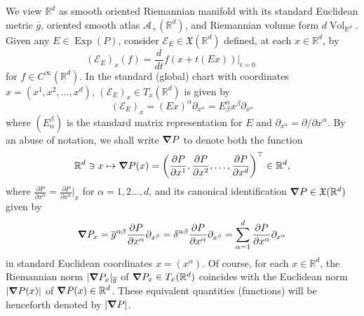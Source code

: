 \documentclass[11pt]{article}
\newcommand\Exp{\operatorname{Exp}}
\newcommand{\Vol}{\operatorname{Vol}}
\begin{document}
\noindent We view $\mathbb{R}^d$ as smooth oriented Riemannian manifold with its standard Euclidean metric $\overline{g}$, oriented smooth atlas $\mathcal{A}_+(\mathbb{R}^d)$, and Riemannian volume form $ d\Vol_{\mathbb{R}^d}$. Given any $E\in\Exp(P)$, consider $\mathcal{E}_E\in \mathfrak{X}(\mathbb{R}^d)$ defined, at each $x\in\mathbb{R}^d$, by
\begin{equation*}
    (\mathcal{E}_E)_x(f)=\frac{d}{dt}f(x+t(Ex))\big\vert_{t=0}\hspace{1cm}
\end{equation*}
for $f\in C^\infty(\mathbb{R}^d)$. In the standard (global) chart with coordinates $x=(x^1,x^2,\dots,x^d)$, $(\mathcal{E}_E)_{x}\in T_{x}(\mathbb{R}^d)$ is given by
\begin{equation*}
    (\mathcal{E}_E)_{x}=(Ex)^{\alpha}\partial_{x^\alpha}=E^\alpha_\beta x^{\beta}\partial_{x^\alpha}
\end{equation*}
where $(E_\alpha^\beta)$ is the standard matrix representation for $E$ and  $\partial_{x^{\alpha}}=\partial/\partial x^\alpha$. By an abuse of notation, we shall write $\grad P$ to denote both the function
\begin{equation*}
\mathbb{R}^d\ni x\mapsto \grad P(x)=\left(\frac{\partial P}{\partial x^1},\frac{\partial P}{\partial x^2},\dots,\frac{\partial P}{\partial x^d}\right)^{\top}\in\mathbb{R}^d,
\end{equation*}
where $\frac{\partial P}{\partial x^{\alpha}}=\frac{\partial P}{\partial x^{\alpha}}\vert_{x}$ for $\alpha=1,2\dots,d$, and its canonical identification $\grad P\in \mathfrak{X}(\mathbb{R}^d)$ given by \begin{equation*}
    \grad P_x=\overline{g}^{\alpha\beta}\frac{\partial P}{\partial x^{\alpha}}\partial_{x^{\beta}}=\delta^{\alpha\beta}\frac{\partial P}{\partial x^{\alpha}}\partial_{x^{\beta}}=\sum_{\alpha=1}^d\frac{\partial P}{\partial x^{\alpha}}\partial_{x^\alpha}
\end{equation*}
in standard Euclidean coordinates $x=(x^\alpha)$. Of course, for each $x\in\mathbb{R}^d$, the Riemannian norm $|\grad P_x |_{\overline{g}}$ of $\grad P_x \in T_x (\mathbb{R}^d)$ coincides with the Euclidean norm $| \grad P(x) |$ of $ \grad P(x) \in \mathbb{R}^d$. These equivalent quantities (functions) will be henceforth denoted by $|\grad P|$.
\end{document}

